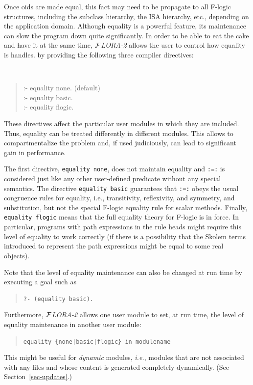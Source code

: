 \documentclass[11pt]{article}
\newcommand{\FLORA}{{\mbox{${\cal F}${\small\it LORA}\rm\emph{-2}}}\xspace}
\newcommand{\fl}{\mbox{F-logic}\xspace}
\begin{document}
Once oids are made equal, this fact may need to be propagate to all \fl
structures, including the subclass hierarchy, the ISA hierarchy, etc.,
depending on the application domain. Although equality is a powerful
feature, its maintenance can slow the program down quite significantly.
In order to be able to eat the cake and have it at the same time, \FLORA
allows the user to control how equality is handles.
by providing the following three compiler directives:
{\tt
\begin{quote}
:- equality none.  (default)\\
:- equality basic.\\
:- equality flogic.
\end{quote}
}

\noindent
These directives affect the particular user modules in which they are
included.  Thus, equality can be treated differently in different modules.
This allows to compartmentalize the problem and, if used judiciously, can
lead to significant gain in performance.

The first directive, \mbox{\tt equality none}, does not maintain equality
and {\tt :=:} is considered just like any other user-defined predicate
without any special semantics.  The directive \mbox{\tt equality basic}
guarantees that {\tt :=:} obeys the usual congruence rules for equality,
i.e., transitivity, reflexivity, and symmetry, and substitution, but not the
special \fl equality rule for scalar methods. Finally, \mbox{\tt equality
  flogic} means that the full equality theory for \fl is in force.  In
particular, programs with path expressions in the rule heads might require
this level of equality to work correctly (if there is a possibility that
the Skolem terms introduced to represent the path expressions might be
equal to some real objects).

Note that the level of equality maintenance can also be changed at run time
by executing a goal such as 
\begin{quote}
 {\tt ?- (equality basic).}
\end{quote}
Furthermore, \FLORA allows one user module to set, at run time, the level
of equality maintenance in another user module:
\begin{quote}
\verb!equality {none|basic|flogic} in modulename!
\end{quote}
This might be useful for \emph{dynamic} modules, {\it i.e.}, modules that
are not associated with any files and whose content is generated completely
dynamically. (See Section~\ref{sec-updates}.)
\end{document}
